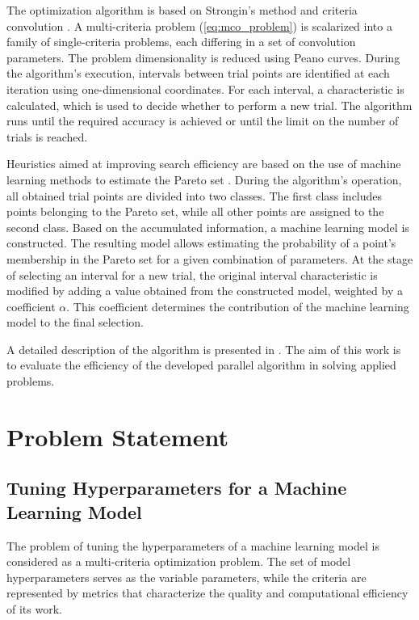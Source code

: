 \documentclass[a4paper]{llncs}
\begin{document}
The optimization algorithm is based on Strongin's method and criteria convolution \cite{Gergel2019_2,Gergel2018,GergelKozinov2020,Strongin2000}. A multi-criteria problem (\ref{eq:mco_problem}) is scalarized into a family of single-criteria problems, each differing in a set of convolution parameters. The problem dimensionality is reduced using Peano curves. During the algorithm's execution, intervals between trial points are identified at each iteration using one-dimensional coordinates. For each interval, a characteristic is calculated, which is used to decide whether to perform a new trial. The algorithm runs until the required accuracy is achieved or until the limit on the number of trials is reached.

Heuristics aimed at improving search efficiency are based on the use of machine learning methods to estimate the Pareto set \cite{Konnov2025}. During the algorithm's operation, all obtained trial points are divided into two classes. The first class includes points belonging to the Pareto set, while all other points are assigned to the second class. Based on the accumulated information, a machine learning model is constructed. The resulting model allows estimating the probability of a point's membership in the Pareto set for a given combination of parameters. At the stage of selecting an interval for a new trial, the original interval characteristic is modified by adding a value obtained from the constructed model, weighted by a coefficient $\alpha$. This coefficient determines the contribution of the machine learning model to the final selection.

A detailed description of the algorithm is presented in \cite{Konnov2025}. The aim of this work is to evaluate the efficiency of the developed parallel algorithm in solving applied problems.

\section{Problem Statement}
\label{sec3}

\subsection{Tuning Hyperparameters for a Machine Learning Model}
\label{subsec31}

The problem of tuning the hyperparameters of a machine learning model is considered as a multi-criteria optimization problem. The set of model hyperparameters serves as the variable parameters, while the criteria are represented by metrics that characterize the quality and computational efficiency of its work.
\end{document}
